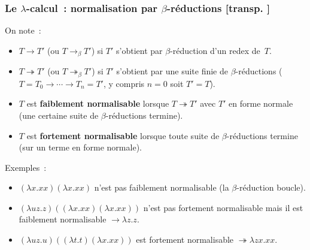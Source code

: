 \documentclass[mathserif,a4paper,aspectratio=169]{beamer}
\renewcommand{\frametitle}[1]{\subsubsection*{#1 {\footnotesize[transp. \insertframenumber]}}}
\begin{document}
\begin{frame}
\frametitle{Le $\lambda$-calcul : normalisation par $\beta$-réductions}

On note :
\begin{itemize}
\item $T \rightarrow T'$ (ou $T \rightarrow_\beta T'$) si $T'$
  s'obtient par $\beta$-réduction d'un redex de $T$.
\item $T \twoheadrightarrow T'$ (ou $T \twoheadrightarrow_\beta T'$)
  si $T'$ s'obtient par une suite finie de $\beta$-réductions ($T =
  T_0 \rightarrow \cdots \rightarrow T_n = T'$, y compris $n=0$ soit
  $T'=T$).
\item $T$ est \textbf{faiblement normalisable} lorsque $T
  \twoheadrightarrow T'$ avec $T'$ en forme normale (\alert{une
    certaine} suite de $\beta$-réductions termine).
\item $T$ est \textbf{fortement normalisable} lorsque \alert{toute}
  suite de $\beta$-réductions termine (sur un terme en forme normale).
\end{itemize}

\bigskip

Exemples :
\begin{itemize}
\item $(\lambda x.xx)(\lambda x.xx)$ n'est pas faiblement
  normalisable (la $\beta$-réduction boucle).
\item $(\lambda uz.z)((\lambda x.xx)(\lambda x.xx))$ n'est
  pas fortement normalisable mais il est faiblement normalisable
  $\rightarrow \lambda z.z$.
\item $(\lambda uz.u)((\lambda t.t)(\lambda x.xx))$ est fortement
  normalisable $\twoheadrightarrow \lambda zx.xx$.
\end{itemize}

\end{frame}
%
\end{document}
